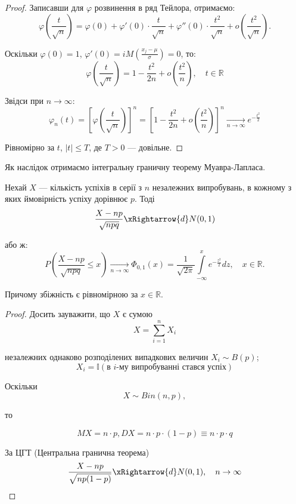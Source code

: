 \begin{proof}
    Записавши для $\varphi$ розвинення в ряд Тейлора,
    отримаємо:
    $$\varphi\left(\dfrac{t}{\sqrt{n}}\right)
    = \varphi(0)
        + \varphi'(0) \cdot \dfrac{t}{\sqrt{n}}
        + \varphi''(0) \cdot \dfrac{t^2}{\sqrt{n}}
        + o\left(\dfrac{t^2}{\sqrt{n}}\right).$$
    
    Оскільки $\varphi(0) = 1$,
    $\varphi'(0) = i M\left( \frac{x_j - \mu}{\sigma} \right) = 0$,
    то:
    $$\varphi\left( \dfrac{t}{\sqrt{n}} \right)
    = 1 - \dfrac{t^2}{2n} + o\left(\dfrac{t^2}{n}\right), \quad t \in \mathbb{R}$$
    
    Звідси при $n \rightarrow \infty$: 
    $$\varphi_n(t)
    = \left[ \varphi(\dfrac{t}{\sqrt{n}}) \right]^n
    = \left[ 1 - \dfrac{t^2}{2n} + o\left(\dfrac{t^2}{n}\right) \right]^n
    \xrightarrow[n \rightarrow \infty]{} e^{-\frac{t^2}{2}}$$

    Рівномірно за $t$, $|t| \leqslant T$, де $T > 0$ --- довільне.
\end{proof}

Як наслідок отримаємо інтегральну граничну
теорему Муавра-Лапласа.

\begin{theorem}
    Нехай $X$ --- кількість успіхів в серії з $n$ незалежних
    випробувань, в кожному з яких ймовірність
    успіху дорівнює $p$.
    Тоді
    $$\dfrac{X - np}{\sqrt{npq}} \xRightarrow{d} N(0, 1)$$

    або ж:
    $$P\left( \dfrac{X - np}{\sqrt{npq}} \leqslant x \right) \xrightarrow[n \rightarrow \infty]{}
    \Phi_{0, 1}(x)
    = \dfrac{1}{\sqrt{2 \pi}} \int\limits_{-\infty}^{x} e^{-\frac{z^2}{2}} dz,
    \quad x \in \mathbb{R}.$$

    Причому збіжність є рівномірною за $x \in \mathbb{R}$.
\end{theorem}
\begin{proof}
    Досить зауважити, що $X$ є сумою
    $$X = \sum\limits_{i=1}^n X_i$$

    незалежних однаково розподілених випадкових величин
    $X_i \sim B(p)$;
    $$X_i = \mathbb{I}(\text{в } i \text{-му випробуванні стався успіх})$$

    Оскільки
    $$X \sim Bin(n, p),$$
    
    то
    
    $$MX = n \cdot p, DX = n \cdot p \cdot (1-p) \equiv n \cdot p \cdot q$$
    
    За ЦГТ (Центральна гранична теорема)
    $$\dfrac{X - np}{\sqrt{np(1-p)}} \xRightarrow{d} N(0, 1), \quad n \rightarrow \infty$$
\end{proof}


